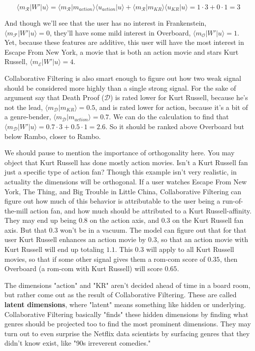 \documentclass{amsbook}
\begin{document}
$$
\langle m_{\mathcal R}|W'|u\rangle = \langle m_{\mathcal R}|m_{action}\rangle\langle u_{action}|u\rangle + \langle m_{\mathcal R}|m_{KR}\rangle\langle u_{KR}|u\rangle = 1\cdot 3 + 0\cdot 1 = 3
$$

And though we'll see that the user has no interest in Frankenstein, $\langle m_{\mathcal F}|W'|u\rangle=0$, they'll have some mild interest in Overboard, $\langle m_{\mathcal O}|W'|u\rangle=1$.  Yet, because these features are additive, this user will have the most interest in Escape From New York, a movie that is both an action movie and stars Kurt Russell, $\langle m_{\mathcal E}|W'|u\rangle=4$.

Collaborative Filtering is also smart enough to figure out how two weak signal should be considered more highly than a single strong signal.  For the sake of argument say that Death Proof ($\mathcal D$) is rated lower for Kurt Russell, because he's not the lead, $\langle m_{\mathcal D}|m_{KR}\rangle = 0.5$, and is rated lower for action, because it's a bit of a genre-bender, $\langle m_{\mathcal D}|m_{action}\rangle = 0.7$.  We can do the calculation to find that $\langle m_{\mathcal D}|W'|u\rangle = 0.7\cdot 3+0.5\cdot 1 = 2.6$.  So it should be ranked above Overboard but below Rambo, closer to Rambo.

We should pause to mention the importance of orthogonality here.  You may object that Kurt Russell has done mostly action movies.  Isn't a Kurt Russell fan just a specific type of action fan?  Though this example isn't very realistic, in actuality the dimensions will be orthogonal.  If a user watches Escape From New York, The Thing, and Big Trouble in Little China, Collaborative Filtering can figure out how much of this behavior is attributable to the user being a run-of-the-mill action fan, and how much should be attributed to a Kurt Russell-affinity.  They may end up being $0.8$ on the action axis, and $0.3$ on the Kurt Russell fan axis.  But that $0.3$ won't be in a vacuum.  The model can figure out that for that user Kurt Russell enhances an action movie by $0.3$, so that an action movie with Kurt Russell will end up totaling $1.1$.  This $0.3$ will apply to all Kurt Russell movies, so that if some other signal gives them a rom-com score of $0.35$, then Overboard (a rom-com with Kurt Russell) will score $0.65$.

The dimensions "action" and "KR" aren't decided ahead of time in a board room, but rather come out as the result of Collaborative Filtering.  These are called {\bf latent dimensions}, where "latent" means something like hidden or underlying.  Collaborative Filtering basically "finds" these hidden dimensions by finding what genres should be projected too to find the most prominent dimensions.  They may turn out to even surprise the Netflix data scientists by surfacing genres that they didn't know exist, like "90s irreverent comedies."
\end{document}
